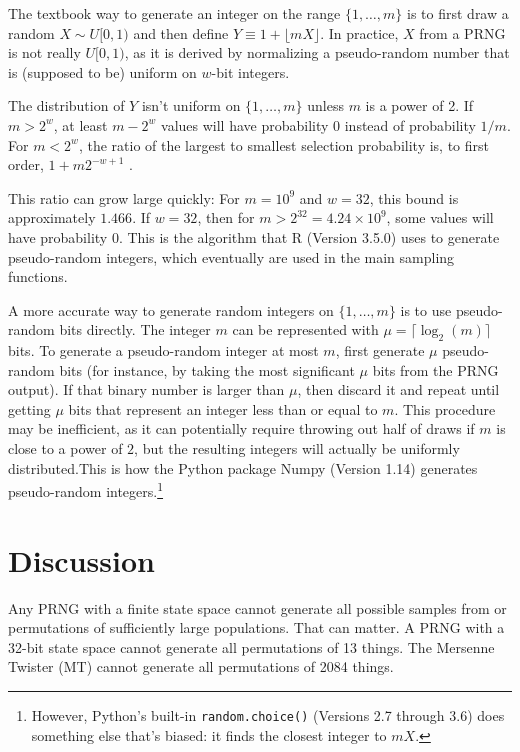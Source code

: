\documentclass[graybox]{svmult}
\begin{document}
The textbook way to generate an integer on the range $\{1, \ldots, m\}$ is to first draw a random $X \sim U[0,1)$
and then define $Y \equiv 1 + \lfloor mX \rfloor$. 
In practice, $X$ from a PRNG is not really $U[0,1)$, as it is derived by normalizing a pseudo-random number that is
 (supposed to be) uniform on $w$-bit integers. 

The distribution of $Y$ isn't uniform on $\{1, \ldots, m\}$ unless $m$ is a power of 2.
If $m > 2^w$, at least $m-2^w$ values will have probability 0 instead of probability $1/m$.
For $m < 2^w$, the ratio of the largest to smallest selection probability is, to first order,  $1+ m 2^{-w+1}$ \cite{knuth_art_1997}.

This ratio can grow large quickly: For $m = 10^9$ and $w=32$, this bound is approximately $1.466$. 
If $w=32$, then for $m>2^{32}=4.24 \times 10^9$, some values will have probability 0. 
This is the algorithm that R (Version 3.5.0) \cite{R_2018} uses to generate pseudo-random integers,
which eventually are used in the main sampling functions.
    
A more accurate way to generate random integers on $\{1, \dots, m\}$ is to use pseudo-random bits directly. 
The integer $m$ can be represented with $\mu = \lceil \log_2(m) \rceil$ bits. 
To generate a pseudo-random integer at most $m$, first generate $\mu$ pseudo-random bits (for instance, by taking the most significant $\mu$ bits from the PRNG output).  
If that binary number is larger than $\mu$, then discard it and repeat until getting $\mu$ bits that represent an integer less than or equal to $m$.
This procedure may be inefficient, as it can potentially require throwing out half of draws if $m$ is close to a power of $2$, but the resulting integers will actually be uniformly distributed.This is how the Python package Numpy (Version 1.14) generates pseudo-random integers.\footnote{
However, Python's built-in \texttt{random.choice()} (Versions 2.7 through 3.6) does something else that's biased: it finds the closest integer to $mX$.
}


\section{Discussion}
\label{sec:discussion}

Any PRNG with a finite state space cannot generate all possible samples from or permutations of 
sufficiently large populations.
That can matter.
A PRNG with a 32-bit state space cannot generate all permutations of 13 things.
The Mersenne Twister (MT) cannot generate all permutations of 2084 things.
\end{document}
